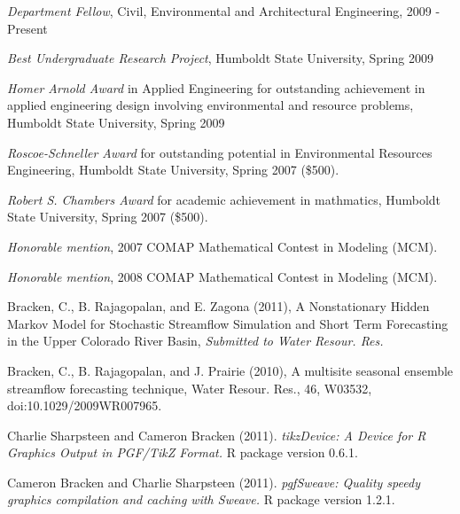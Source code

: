 \documentclass[10pt,a4paper]{scrartcl}
\begin{document}
\begin{cv}{}
        \begin{cvlist}{}\label{awards}
            \item   \textit{Department Fellow}, Civil, Environmental and Architectural Engineering, 2009 - Present
            \item   \textit{Best Undergraduate Research Project}, Humboldt State University, Spring 2009
            \item   \textit{Homer Arnold Award} in Applied Engineering for outstanding achievement in applied engineering design involving environmental and resource problems, Humboldt State University, Spring 2009 
            \item   \textit{Roscoe-Schneller Award} for outstanding potential in Environmental Resources Engineering, Humboldt State University, Spring 2007 (\$500).

	        \item \textit{Robert S. Chambers Award} for academic achievement in mathmatics, Humboldt State University, Spring 2007 (\$500).

	        \item \textit{Honorable mention}, 2007 COMAP Mathematical Contest in Modeling (MCM).
	
	        \item \textit{Honorable mention}, 2008 COMAP Mathematical Contest in Modeling (MCM).
        \end{cvlist}
        
        \begin{cvlist}{}\label{pub}
	        \item Bracken, C., B. Rajagopalan, and E. Zagona (2011), A Nonstationary Hidden Markov Model for Stochastic Streamflow Simulation and Short Term Forecasting in the Upper Colorado River Basin, {\it Submitted to Water Resour. Res.}
            \item   Bracken, C., B. Rajagopalan, and J. Prairie (2010), A multisite seasonal ensemble streamflow forecasting technique, Water Resour. Res., 46, W03532, doi:10.1029/2009WR007965.
         \end{cvlist}

        \begin{cvlist}{}\label{software}
            \item Charlie Sharpsteen and Cameron Bracken (2011). \textit{tikzDevice: A Device for R Graphics Output in PGF/TikZ Format.}  R package version 0.6.1.
            \item Cameron Bracken  and Charlie Sharpsteen (2011). \textit{pgfSweave: Quality speedy graphics compilation and caching with Sweave.} R package version 1.2.1.
        \end{cvlist}


\end{cv}
\end{document}
